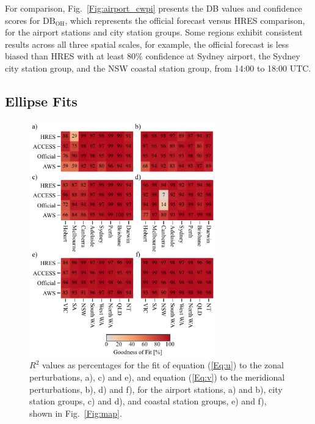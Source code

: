 \documentclass{ametsoc}
\begin{document}
For comparison, Fig.~\ref{Fig:airport_cwpi} presents the DB values and confidence scores for $\text{DB}_\text{OH}$, which represents the official forecast versus HRES comparison, for the airport stations and city station groups. Some regions exhibit consistent results across all three spatial scales, for example, the official forecast is less biased than HRES with at least $80 \%$ confidence at Sydney airport, the Sydney city station group, and the NSW coastal station group, from 14:00 to 18:00 UTC.  

\subsection{Ellipse Fits}

\begin{figure}
\centering
\includegraphics[width=19pc]{r_squared.pdf}
\caption{$R^2$ values as percentages for the fit of equation (\ref{Eq:u}) to the zonal perturbations, a), c) and e), and equation (\ref{Eq:v}) to the meridional perturbations, b), d) and f), for the airport stations, a) and b), city station groups, c) and d), and coastal station groups, e) and f), shown in Fig.~\ref{Fig:map}.}
\label{Fig:r_squared}
\end{figure}
\end{document}
